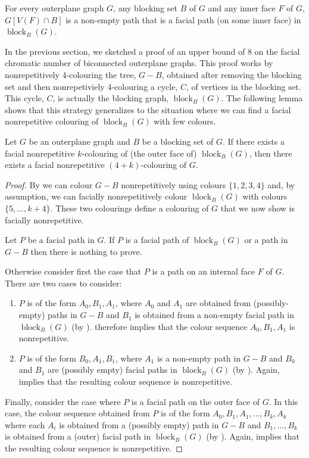 \documentclass{patmorin}
\DeclareMathOperator{\block}{block}
\begin{document}
\begin{obs}
  For every outerplane graph $G$, any blocking set $B$ of $G$ and any
  inner face $F$ of $G$, $G[V(F)\cap B]$ is a non-empty path that is a
  facial path (on some inner face)  in $\block_B(G)$.
\end{obs}

In the previous section, we sketched a proof of an upper bound of 8 on
the facial chromatic number of biconnected outerplane graphs.  This proof
works by nonrepetitively 4-colouring the tree, $G-B$, obtained after
removing the blocking set and then nonrepetiviely 4-colouring a cycle,
$C$, of vertices in the blocking set.  This cycle, $C$, is actually
the blocking graph, $\block_B(G)$.  The following lemma shows that
this strategy generalizes to the situation where we can find a facial
nonrepetitive colouring of $\block_B(G)$ with few colours.

\begin{lem}
  Let $G$ be an outerplane graph and $B$ be a blocking set of $G$. If
  there exists a facial nonrepetitive $k$-colouring of (the outer 
  face of) $\block_{B}(G)$, then there exists a facial nonrepetitive
  $(4+k)$-colouring of $G$.
\end{lem}

\begin{proof}
By  we can colour $G-B$ nonrepetitively using colours
$\{1,2,3,4\}$ and, by assumption, we can facially nonrepetitively colour
$\block_{B}(G)$ with colours $\{5,\dots, k+4\}$. These two colourings
define a colouring of $G$ that we now show is facially nonrepetitive.

Let $P$ be a facial path in $G$. If $P$ is a facial path of
$\block_{B}(G)$ or a path in $G-B$ then there is nothing to prove.

Otherwise consider first the case that $P$ is a path on an internal
face $F$ of $G$.   There are two cases to consider:
\begin{enumerate}
\item $P$ is of the form $A_0,B_1,A_1$, where $A_0$ and $A_1$ are obtained
from (possibly-empty) paths in $G-B$ and $B_1$ is obtained from a
non-empty facial path in $\block_B(G)$ (by ).   therefore
implies that the colour sequence $A_0,B_1,A_1$ is nonrepetitive.

\item $P$ is of the form $B_0,A_1,B_1$, where $A_1$ is a non-empty path
  in $G-B$ and $B_0$ and $B_1$ are (possibly empty) facial paths in
  $\block_B(G)$ (by ).
Again,  implies that the resulting colour sequence
is nonrepetitive.
\end{enumerate}

Finally, consider the case where $P$ is a facial path on the outer face
of $G$.  In this case, the colour sequence obtained from $P$ is of the
form $A_0,B_1,A_1,\ldots,B_k,A_k$ where each $A_i$ is obtained from a
(possibly empty) path in $G-B$ and $B_1,\ldots,B_k$ is obtained from
a (outer) facial path in $\block_B(G)$ (by ).  Again,
 implies that the resulting colour sequence is
nonrepetitive.
\end{proof}
\end{document}
